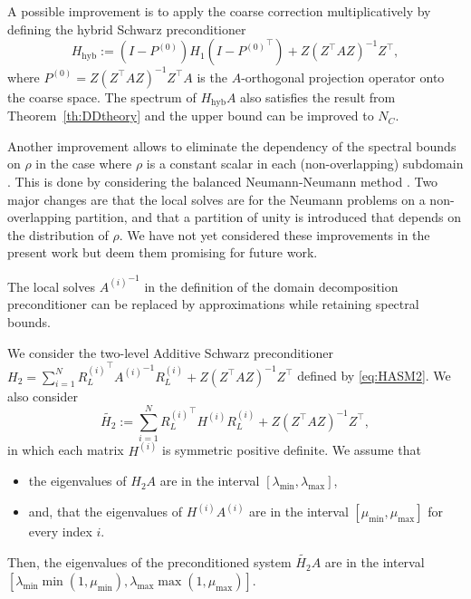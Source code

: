 \documentclass[onefignum,onetabnum]{siamart251216}
\newcommand{\Hone}{H_1}
\newcommand{\Hhyb}{H_{\text{hyb}}}
\newcommand{\Htwo}{H_2}
\newcommand{\Htwoap}{\widetilde{\Htwo}}
\begin{document}
\begin{remark}
A possible improvement is to apply the coarse correction multiplicatively by defining the hybrid Schwarz preconditioner
\begin{equation}
    \Hhyb := (I - P^{(0)}) \Hone (I - {P^{(0)}}^\top) +  Z (Z^\top A Z)^{-1} Z^\top,
\end{equation}
where $P^{(0)} = Z (Z^\top A Z)^{-1} Z^\top A$ is the $A$-orthogonal projection operator onto the coarse space. The spectrum of $\Hhyb A$ also satisfies the result from Theorem~\ref{th:DDtheory} and the upper bound can be improved to $N_C$.  

Another improvement allows to eliminate the dependency of the spectral bounds on $\rho$ in the case where $\rho$ is a constant scalar in each (non-overlapping) subdomain \cite[Th. 5]{zbMATH01592007}. This is done by considering the balanced Neumann-Neumann method \cite[Sec. 6.2]{zbMATH00635667}. Two major changes are that the local solves are for the Neumann problems on a non-overlapping partition, and that a partition of unity is introduced that depends on the distribution of $\rho$. We have not yet considered these improvements in the present work but deem them promising for future work.  
\end{remark}

The local solves ${A^{(i)}}^{-1}$ in the definition of the domain decomposition preconditioner can be replaced by approximations while retaining spectral bounds.  

\begin{theorem}
We consider the two-level Additive Schwarz preconditioner 
$\Htwo = \sum_{i=1}^N {R_L^{(i)}}^\top {A^{(i)}}^{-1} R_L^{(i)} + Z (Z^\top A Z)^{-1} Z^\top$ defined by \eqref{eq:HASM2}. 
We also consider 
\begin{equation}
\Htwoap := \sum_{i=1}^N {R_L^{(i)}}^\top H^{(i)} R_L^{(i)} + Z (Z^\top A Z)^{-1} Z^\top,
\end{equation}
in which each matrix $H^{(i)}$ is symmetric positive definite. We assume that 

\begin{itemize}
\item the eigenvalues of $\Htwo A$ are in the interval $[\lambda_{\min},\lambda_{\max}]$, 
\item and, that the eigenvalues of $H^{(i)} A^{(i)}$ are in the interval $[\mu_{\min}, \mu_{\max}]$ for every index $i$. 
\end{itemize}
Then, the eigenvalues of the preconditioned system $\Htwoap A$ are in the interval \\ $[\lambda_{\min} \min (1, \mu_{\min}), \lambda_{\max} \max (1, \mu_{\max})]$.
\label{th:th_kappa_DD_BPX}
\end{theorem}
\end{document}

